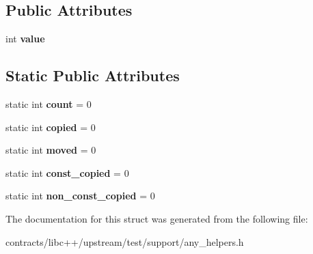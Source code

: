 \subsection*{Public Attributes}
\begin{DoxyCompactItemize}
\item 
\mbox{\label{structsmall__type_a2a5ddceca44bc8d40677c83a8dc7abef}} 
int {\bfseries value}
\end{DoxyCompactItemize}
\subsection*{Static Public Attributes}
\begin{DoxyCompactItemize}
\item 
\mbox{\label{structsmall__type_a2d53c1f3e1b2f298a22374a306791902}} 
static int {\bfseries count} = 0
\item 
\mbox{\label{structsmall__type_aec54c10472ee84a8c0e26ba470a5adbe}} 
static int {\bfseries copied} = 0
\item 
\mbox{\label{structsmall__type_a5d8e016e1f9c2de6b9b16cc98a25b8ad}} 
static int {\bfseries moved} = 0
\item 
\mbox{\label{structsmall__type_a782dcdff36cc177ed6b511e4eeb5d472}} 
static int {\bfseries const\+\_\+copied} = 0
\item 
\mbox{\label{structsmall__type_ab21dd0ba12485f997c32648e852eda75}} 
static int {\bfseries non\+\_\+const\+\_\+copied} = 0
\end{DoxyCompactItemize}


The documentation for this struct was generated from the following file\+:\begin{DoxyCompactItemize}
\item 
contracts/libc++/upstream/test/support/any\+\_\+helpers.\+h\end{DoxyCompactItemize}
